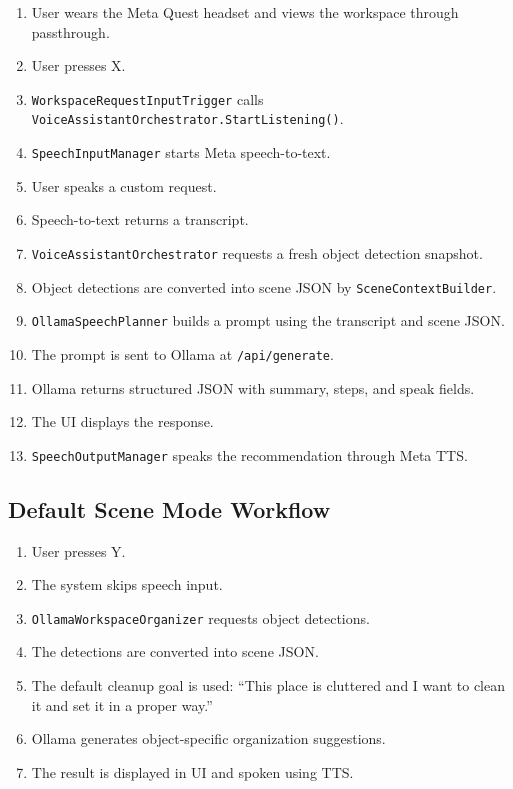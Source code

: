 \documentclass[12pt,a4paper]{article}
\begin{document}
\begin{enumerate}
    \item User wears the Meta Quest headset and views the workspace through passthrough.
    \item User presses X.
    \item \texttt{WorkspaceRequestInputTrigger} calls \texttt{VoiceAssistantOrchestrator.StartListening()}.
    \item \texttt{SpeechInputManager} starts Meta speech-to-text.
    \item User speaks a custom request.
    \item Speech-to-text returns a transcript.
    \item \texttt{VoiceAssistantOrchestrator} requests a fresh object detection snapshot.
    \item Object detections are converted into scene JSON by \texttt{SceneContextBuilder}.
    \item \texttt{OllamaSpeechPlanner} builds a prompt using the transcript and scene JSON.
    \item The prompt is sent to Ollama at \texttt{/api/generate}.
    \item Ollama returns structured JSON with summary, steps, and speak fields.
    \item The UI displays the response.
    \item \texttt{SpeechOutputManager} speaks the recommendation through Meta TTS.
\end{enumerate}

\subsection{Default Scene Mode Workflow}

\begin{enumerate}
    \item User presses Y.
    \item The system skips speech input.
    \item \texttt{OllamaWorkspaceOrganizer} requests object detections.
    \item The detections are converted into scene JSON.
    \item The default cleanup goal is used: ``This place is cluttered and I want to clean it and set it in a proper way.''
    \item Ollama generates object-specific organization suggestions.
    \item The result is displayed in UI and spoken using TTS.
\end{enumerate}
\end{document}
